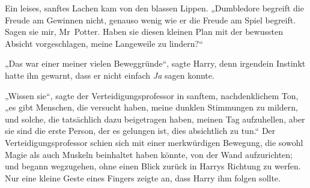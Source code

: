 Ein leises, sanftes Lachen kam von den blassen Lippen.
„Dumbledore begreift die Freude am Gewinnen nicht, genauso wenig wie er die Freude am Spiel begreift. Sagen sie mir, Mr~Potter. Haben sie diesen kleinen Plan mit der bewussten Absicht vorgeschlagen, meine Langeweile zu lindern?“

„Das war einer meiner vielen Beweggründe“, sagte Harry, denn irgendein Instinkt hatte ihn gewarnt, dass er nicht einfach \emph{Ja} sagen konnte.

„Wissen sie“, sagte der Verteidigungsprofessor in sanftem, nachdenklichem Ton, „es gibt Menschen, die versucht haben, meine dunklen Stimmungen zu mildern, und solche, die tatsächlich dazu beigetragen haben, meinen Tag aufzuhellen, aber sie sind die erste Person, der es gelungen ist, dies absichtlich zu tun.“ Der Verteidigungsprofessor schien sich mit einer merkwürdigen Bewegung, die sowohl Magie als auch Muskeln beinhaltet haben könnte, von der Wand aufzurichten; und begann wegzugehen, ohne einen Blick zurück in Harrys Richtung zu werfen. Nur eine kleine Geste eines Fingers zeigte an, dass Harry ihm folgen sollte.

